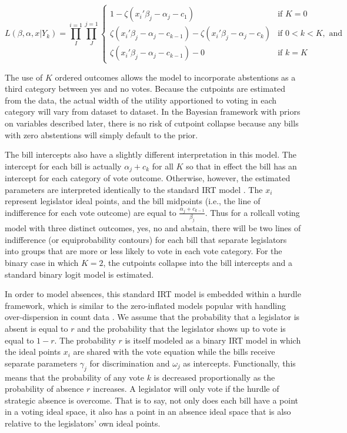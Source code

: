 					\[
	L(\beta,\alpha,x|Y_{k}) = \prod_{I}^{i=1} \prod_{J}^{j=1}
	\begin{cases} 
	1 -  \zeta(x_{i}'\beta_j - \alpha_j - c_1) & \text{if } K = 0 \\
	\zeta(x_{i}'\beta_j - \alpha_j - c_{k-1}) - \zeta(x_{i}'\beta_j - \alpha_j - c_{k})       & \text{if } 0 < k < K, \text{ and} \\
	\zeta(x_{i}'\beta_j - \alpha_j - c_{k-1}) - 0 & \text{if } k=K
	\end{cases}
	\]
	
	The use of $K$ ordered outcomes allows the model to incorporate abstentions as a third category between yes and no votes. Because the cutpoints are estimated from the data, the actual width of the utility apportioned to voting in each category will vary from dataset to dataset. In the Bayesian framework with priors on variables described later, there is no risk of cutpoint collapse because any bills with zero abstentions will simply default to the prior.
	
	The bill intercepts also have a slightly different interpretation in this model. The intercept for each bill is actually $\alpha_j + c_k$ for all $K$ so that in effect the bill has an intercept for each category of vote outcome. Otherwise, however, the estimated parameters are interpreted identically to the standard IRT model \parencite{jackman2004}. The $x_i$ represent legislator ideal points, and the bill midpoints (i.e., the line of indifference for each vote outcome) are equal to $\frac{\alpha_j + c_{k-1}}{\beta_j}$. Thus for a rollcall voting model with three distinct outcomes, yes, no and abstain, there will be two lines of indifference (or equiprobability contours) for each bill that separate legislators into groups that are more or less likely to vote in each vote category. For the binary case in which $K=2$, the cutpoints collapse into the bill intercepts and a standard binary logit model is estimated.
	
	In order to model absences, this standard IRT model is embedded within a hurdle framework, which is similar to the zero-inflated models popular with handling over-dispersion in count data \parencite{zorn1998}. We assume that the probability that a legislator is absent is equal to $r$ and the probability that the legislator shows up to vote is equal to $1-r$. The probability $r$ is itself modeled as a binary IRT model in which the ideal points $x_i$ are shared with the vote equation while the bills receive separate parameters $\gamma_j$ for discrimination and $\omega_j$ as intercepts. Functionally, this means that the probability of any vote $k$ is decreased proportionally as the probability of absence $r$ increases. A legislator will only vote if the hurdle of strategic absence is overcome. That is to say, not only does each bill have a point in a voting ideal space, it also has a point in an absence ideal space that is also relative to the legislators' own ideal points.
	

